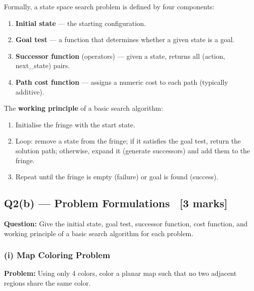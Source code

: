 \documentclass[12pt, a4paper]{article}
\newenvironment{solutionbox}{\begin{mdframed}[style=solutionframe]}{\end{mdframed}}
\begin{document}
\noindent Formally, a state space search problem is defined by four components:
\begin{enumerate}[noitemsep]
  \item \textbf{Initial state} — the starting configuration.
  \item \textbf{Goal test} — a function that determines whether a given state is a goal.
  \item \textbf{Successor function} (operators) — given a state, returns all (action, next\_state) pairs.
  \item \textbf{Path cost function} — assigns a numeric cost to each path (typically additive).
\end{enumerate}

\noindent The \textbf{working principle} of a basic search algorithm:
\begin{enumerate}[noitemsep]
  \item Initialise the fringe with the start state.
  \item Loop: remove a state from the fringe; if it satisfies the goal test, return the solution path; otherwise, expand it (generate successors) and add them to the fringe.
  \item Repeat until the fringe is empty (failure) or goal is found (success).
\end{enumerate}

\subsection{Q2(b) — Problem Formulations \ [3 marks]}

\begin{solutionbox}
\textbf{Question:} Give the initial state, goal test, successor function, cost function, and working principle of a basic search algorithm for each problem.
\end{solutionbox}

\subsubsection*{(i) Map Coloring Problem}

\textbf{Problem:} Using only 4 colors, color a planar map such that no two adjacent regions share the same color.
\end{document}
